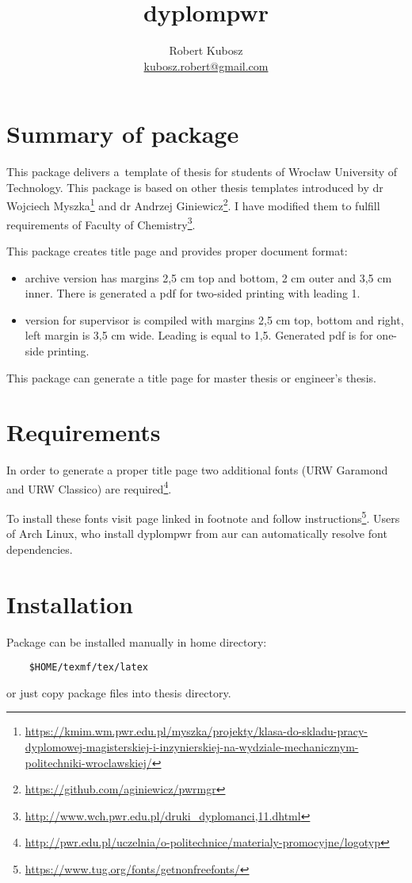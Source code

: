 \documentclass[12pt,a4paper]{article}
\author{Robert Kubosz \\ \href{mailto:kubosz.robert@gmail.com}{kubosz.robert@gmail.com}}
\title{dyplompwr}
\begin{document}
\maketitle
\section{Summary of package} 
\label{sec:wstep}
\par This package delivers a~template of thesis for students of Wrocław
University of Technology. This package is based on other thesis templates
introduced by dr Wojciech
Myszka\footnote{\url{https://kmim.wm.pwr.edu.pl/myszka/projekty/klasa-do-skladu-pracy-dyplomowej-magisterskiej-i-inzynierskiej-na-wydziale-mechanicznym-politechniki-wroclawskiej/}}
and dr Andrzej Giniewicz\footnote{\url{https://github.com/aginiewicz/pwrmgr}}.
I have modified them to fulfill requirements of Faculty of
Chemistry\footnote{\url{http://www.wch.pwr.edu.pl/druki_dyplomanci,11.dhtml}}.
\par This package creates title page and provides proper document format:
\begin{itemize}
    \item archive version has margins 2,5 cm top and bottom, 2 cm outer and 3,5
        cm inner. There is generated a pdf for two-sided printing with leading
        1.
    \item version for supervisor is compiled with margins 2,5 cm top, bottom
        and right, left margin is 3,5 cm wide. Leading is equal to 1,5.
        Generated pdf is for one-side printing.
\end{itemize}
This package can generate a title page for master thesis or engineer's thesis.
\section{Requirements}
\par In order to generate a proper title page two additional fonts (URW
Garamond and URW Classico)  are
required\footnote{\url{http://pwr.edu.pl/uczelnia/o-politechnice/materialy-promocyjne/logotyp}}.
\par To install these fonts visit page linked in footnote and follow
instructions\footnote{\url{https://www.tug.org/fonts/getnonfreefonts/}}. Users
of Arch Linux, who install dyplompwr from aur can automatically resolve font
dependencies.

\section{Installation}
Package can be installed manually in home directory:
\begin{verbatim}
    $HOME/texmf/tex/latex
\end{verbatim}
or just copy package files into thesis directory.
    
\end{document}
